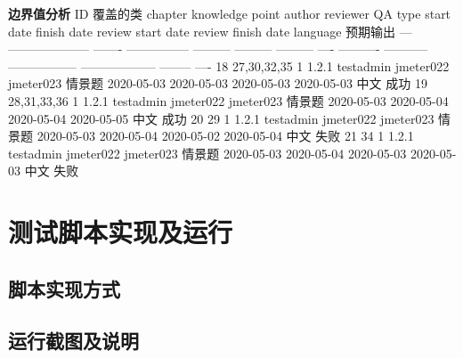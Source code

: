 \documentclass[hyperref, a4paper]{ctexart}
\begin{document}
\textbf{边界值分析} \textbar{} ID \textbar{} 覆盖的类 \textbar{} chapter
\textbar{} knowledge point \textbar{} author \textbar{} reviewer
\textbar{} QA \textbar{} type \textbar{} start date \textbar{} finish
date \textbar{} review start date \textbar{} review finish date
\textbar{} language \textbar{} 预期输出 \textbar{} \textbar{} ---
\textbar{} -------------------- \textbar{} ------- \textbar{}
--------------- \textbar{} --------- \textbar{} --------- \textbar{}
--------- \textbar{} ---- \textbar{} ---------- \textbar{} -----------
\textbar{} ----------------- \textbar{} ------------------ \textbar{}
-------- \textbar{} ---- \textbar{} \textbar{} 18 \textbar{} 27,30,32,35
\textbar{} 1 \textbar{} 1.2.1 \textbar{} testadmin \textbar{} jmeter022
\textbar{} jmeter023 \textbar{} 情景题 \textbar{} 2020-05-03 \textbar{}
2020-05-03 \textbar{} 2020-05-03 \textbar{} 2020-05-03 \textbar{} 中文
\textbar{} 成功 \textbar{} \textbar{} 19 \textbar{} 28,31,33,36
\textbar{} 1 \textbar{} 1.2.1 \textbar{} testadmin \textbar{} jmeter022
\textbar{} jmeter023 \textbar{} 情景题 \textbar{} 2020-05-03 \textbar{}
2020-05-04 \textbar{} 2020-05-04 \textbar{} 2020-05-05 \textbar{} 中文
\textbar{} 成功 \textbar{} \textbar{} 20 \textbar{} 29 \textbar{} 1
\textbar{} 1.2.1 \textbar{} testadmin \textbar{} jmeter022 \textbar{}
jmeter023 \textbar{} 情景题 \textbar{} 2020-05-03 \textbar{} 2020-05-04
\textbar{} 2020-05-02 \textbar{} 2020-05-04 \textbar{} 中文 \textbar{}
失败 \textbar{} \textbar{} 21 \textbar{} 34 \textbar{} 1 \textbar{}
1.2.1 \textbar{} testadmin \textbar{} jmeter022 \textbar{} jmeter023
\textbar{} 情景题 \textbar{} 2020-05-03 \textbar{} 2020-05-04 \textbar{}
2020-05-03 \textbar{} 2020-05-03 \textbar{} 中文 \textbar{} 失败
\textbar{}

\hypertarget{ux6d4bux8bd5ux811aux672cux5b9eux73b0ux53caux8fd0ux884c}{%
\section{测试脚本实现及运行}\label{ux6d4bux8bd5ux811aux672cux5b9eux73b0ux53caux8fd0ux884c}}

\hypertarget{ux811aux672cux5b9eux73b0ux65b9ux5f0f}{%
\subsection{脚本实现方式}\label{ux811aux672cux5b9eux73b0ux65b9ux5f0f}}

\hypertarget{ux8fd0ux884cux622aux56feux53caux8bf4ux660e}{%
\subsection{运行截图及说明}\label{ux8fd0ux884cux622aux56feux53caux8bf4ux660e}}
\end{document}

